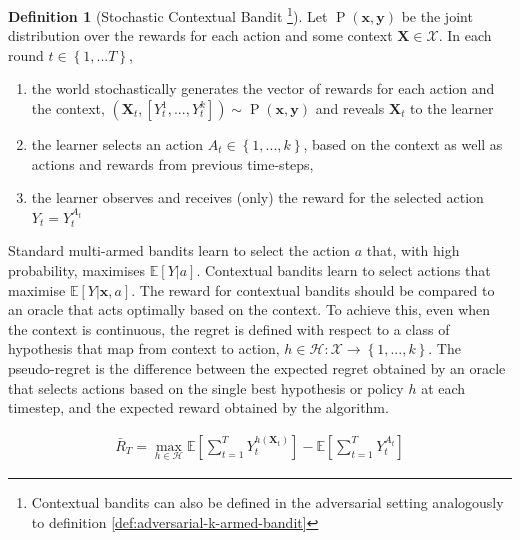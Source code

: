 \documentclass[11pt,a4paper,oneside]{book}
\newcommand{\E}[1]{\mathbb E\left[{#1}\right]}
\newcommand{\set}[1]{\left\{#1\right\}}
\newcommand{\eqn}[1]{\begin{align}#1\end{align}}
\renewcommand{\P}[1]{\operatorname{P}\left(#1\right)}
\newcommand{\cfb}[2]{{#1}_t^{#2}} %
\renewcommand{\vec}[1]{\boldsymbol{#1}}
\newcommand{\regret}{\bar{R}_{T}} %
\theoremstyle{plain}
\theoremstyle{definition}
\newtheorem{definition}[theorem]{Definition}
\begin{document}
\vspace{0.5cm}
\begin{definition}[Stochastic Contextual Bandit \footnote{Contextual bandits can also be defined in the adversarial setting analogously to definition \ref{def:adversarial-k-armed-bandit}}]
\label{def:contextual-bandit-problem}
Let $\P{\vec{x},\vec{y}}$ be the joint distribution over the rewards for each action and some context $\vec{X} \in \mathcal{X}$. In each round $t \in \set{1,...T}$, 
\begin{enumerate}
\item the world stochastically generates the vector of rewards for each action and the context, $(\vec{X}_t,[\cfb{Y}{1},...,\cfb{Y}{k}]) \sim \P{\vec{x},\vec{y}}$ and reveals $\vec{X}_t$ to the learner
\item the learner selects an action $A_{t} \in \set{1,...,k}$, based on the context as well as actions and rewards from previous time-steps,
\item the learner observes and receives (only) the reward for the selected action $Y_t = \cfb{Y}{A_t}$ 
\end{enumerate}
\end{definition} 

Standard multi-armed bandits learn to select the action $a$ that, with high probability, maximises $\E{Y|a}$. Contextual bandits learn to select actions that maximise $\E{Y|\vec{x},a}$. The reward for contextual bandits should  be compared to an oracle that acts optimally based on the context. To achieve this, even when the context is continuous, the regret is defined with respect to a class of hypothesis that map from context to action, $h \in \mathcal{H}: \mathcal{X} \rightarrow \set{1,...,k}$. The pseudo-regret is the difference between the expected regret obtained by an oracle that selects actions based on the single best hypothesis or policy $h$ at each timestep, and the expected reward obtained by the algorithm. 

\eqn{
\label{eqn:regret_contextual}
\regret = \max_{h \in \mathcal{H}}\E{\sum_{t=1}^T{\cfb{Y}{h(\vec{X}_t)}}} - \E{\sum_{t=1}^T{\cfb{Y}{A_t}}}
}
\end{document}
